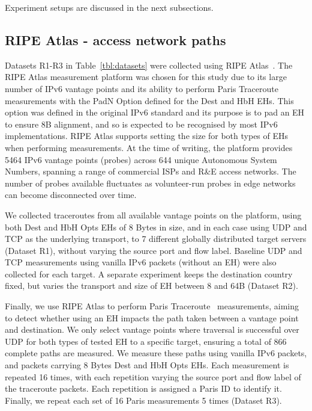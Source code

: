 \documentclass[conference]{IEEEtran}
\begin{document}
Experiment setups are discussed in the next subsections.

    \subsection{RIPE Atlas - access network paths}
    \label{sec:ripe-methodology}

Datasets R1-R3 in Table~\ref{tbl:datasets} were collected using RIPE Atlas~\cite{bajpai2015lessons}.
The RIPE Atlas measurement platform was chosen for this study due to its large number of IPv6 vantage points and its ability to perform Paris Traceroute measurements with the PadN Option defined for the Dest and HbH EHs. This option was defined in the original IPv6 standard and its purpose is to pad an EH to ensure 8B alignment, and so is expected to be recognised by most IPv6 implementations.
RIPE Atlas supports setting the size for both types of EHs when performing measurements. At the time of writing, the platform provides 5464 IPv6 vantage points (probes) across 644 unique Autonomous System Numbers, spanning a range of commercial ISPs and R\&E access networks. The number of probes available fluctuates as volunteer-run probes in edge networks can become disconnected over time.

We collected traceroutes from all available vantage points on the platform, using both Dest and HbH Opts EHs of 8 Bytes in size, and in each case using UDP and TCP as the underlying transport, to 7 different globally distributed target servers (Dataset R1), without varying the source port and flow label. Baseline UDP and TCP measurements using vanilla IPv6 packets (without an EH) were also collected for each target.
A separate experiment keeps the destination country fixed, but varies the transport and size of EH between 8 and 64B (Dataset R2).

Finally, we use RIPE Atlas to perform Paris Traceroute~\cite{augustin2006avoiding} measurements, aiming to detect whether using an EH impacts the path taken between a vantage point and destination. We only select vantage points where traversal is successful over UDP for both types of tested EH to a specific target, ensuring a total of 866 complete paths are measured.
We measure these paths using vanilla IPv6 packets, and packets carrying 8 Bytes Dest and HbH Opts EHs. Each measurement is repeated 16 times, with each repetition varying the source port and flow label of the traceroute packets. Each repetition is assigned a Paris ID to identify it. Finally, we repeat each set of 16 Paris measurements 5 times (Dataset R3).
\end{document}
